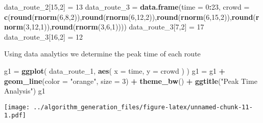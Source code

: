 \documentclass[
]{article}
\newenvironment{Shaded}{\begin{snugshade}}{\end{snugshade}}
\newcommand{\DataTypeTok}[1]{\textcolor[rgb]{0.13,0.29,0.53}{#1}}
\newcommand{\DecValTok}[1]{\textcolor[rgb]{0.00,0.00,0.81}{#1}}
\newcommand{\KeywordTok}[1]{\textcolor[rgb]{0.13,0.29,0.53}{\textbf{#1}}}
\newcommand{\NormalTok}[1]{#1}
\newcommand{\OperatorTok}[1]{\textcolor[rgb]{0.81,0.36,0.00}{\textbf{#1}}}
\newcommand{\StringTok}[1]{\textcolor[rgb]{0.31,0.60,0.02}{#1}}
\begin{document}
\begin{Shaded}
\begin{Highlighting}[]
\NormalTok{data_route_}\DecValTok{2}\NormalTok{[}\DecValTok{15}\NormalTok{,}\DecValTok{2}\NormalTok{] =}\StringTok{ }\DecValTok{13}
\NormalTok{data_route_}\DecValTok{3}\NormalTok{ =}\StringTok{ }\KeywordTok{data.frame}\NormalTok{(}\DataTypeTok{time =} \DecValTok{0}\OperatorTok{:}\DecValTok{23}\NormalTok{, }\DataTypeTok{crowd =} \KeywordTok{c}\NormalTok{(}\KeywordTok{round}\NormalTok{(}\KeywordTok{rnorm}\NormalTok{(}\DecValTok{6}\NormalTok{,}\DecValTok{8}\NormalTok{,}\DecValTok{2}\NormalTok{)),}\KeywordTok{round}\NormalTok{(}\KeywordTok{rnorm}\NormalTok{(}\DecValTok{6}\NormalTok{,}\DecValTok{12}\NormalTok{,}\DecValTok{2}\NormalTok{)),}\KeywordTok{round}\NormalTok{(}\KeywordTok{rnorm}\NormalTok{(}\DecValTok{6}\NormalTok{,}\DecValTok{15}\NormalTok{,}\DecValTok{2}\NormalTok{)),}\KeywordTok{round}\NormalTok{(}\KeywordTok{rnorm}\NormalTok{(}\DecValTok{3}\NormalTok{,}\DecValTok{12}\NormalTok{,}\DecValTok{1}\NormalTok{)),}\KeywordTok{round}\NormalTok{(}\KeywordTok{rnorm}\NormalTok{(}\DecValTok{3}\NormalTok{,}\DecValTok{6}\NormalTok{,}\DecValTok{1}\NormalTok{))))}
\NormalTok{data_route_}\DecValTok{3}\NormalTok{[}\DecValTok{7}\NormalTok{,}\DecValTok{2}\NormalTok{] =}\StringTok{ }\DecValTok{17}
\NormalTok{data_route_}\DecValTok{3}\NormalTok{[}\DecValTok{16}\NormalTok{,}\DecValTok{2}\NormalTok{] =}\StringTok{ }\DecValTok{12}
\end{Highlighting}
\end{Shaded}

Using data analytics we determine the peak time of each route

\begin{Shaded}
\begin{Highlighting}[]
\NormalTok{g1 =}\StringTok{ }\KeywordTok{ggplot}\NormalTok{(}
\NormalTok{  data_route_}\DecValTok{1}\NormalTok{,}
      \KeywordTok{aes}\NormalTok{(}
        \DataTypeTok{x =}\NormalTok{ time,}
        \DataTypeTok{y =}\NormalTok{ crowd}
\NormalTok{      )}
\NormalTok{) }
\NormalTok{g1 =}\StringTok{ }\NormalTok{g1 }\OperatorTok{+}\StringTok{ }\KeywordTok{geom_line}\NormalTok{(}\DataTypeTok{color =} \StringTok{"orange"}\NormalTok{, }\DataTypeTok{size =} \DecValTok{3}\NormalTok{) }\OperatorTok{+}\StringTok{ }\KeywordTok{theme_bw}\NormalTok{() }\OperatorTok{+}\StringTok{ }\KeywordTok{ggtitle}\NormalTok{(}\StringTok{"Peak Time Analysis"}\NormalTok{)}
\NormalTok{g1}
\end{Highlighting}
\end{Shaded}

\texttt{[image: ../algorithm\_generation\_files/figure-latex/unnamed-chunk-11-1.pdf]}
\end{document}
